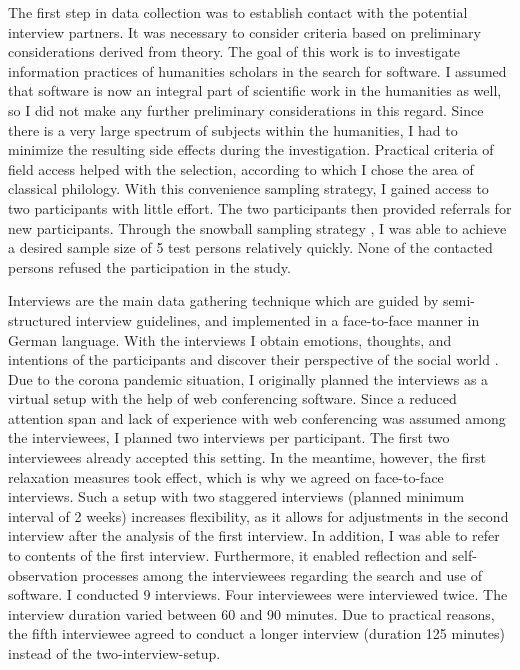 \documentclass[12pt, a4paper, titlepage, oneside, abstract=true, toc=listof, toc=bibliography]{scrreprt}
\begin{document}
The first step in data collection was to establish contact with the potential interview partners. It was necessary to consider criteria based on preliminary considerations derived from theory. The goal of this work is to investigate information practices of humanities scholars in the search for software. I assumed that software is now an integral part of scientific work in the humanities as well, so I did not make any further preliminary considerations in this regard. Since there is a very large spectrum of subjects within the humanities, I had to minimize the resulting side effects during the investigation. Practical criteria of field access helped with the selection, according to which I chose the area of classical philology. With this convenience sampling strategy, I gained access to two participants with little effort. The two participants then provided referrals for new participants. Through the snowball sampling strategy \citep{Biernacki1981}, I was able to achieve a desired sample size of 5 test persons relatively quickly. None of the contacted persons refused the participation in the study.

Interviews are the main data gathering technique which are guided by semi-structured interview guidelines, and implemented in a face-to-face manner \citep{Bryman2004} in German language. With the interviews I obtain emotions, thoughts, and intentions of the participants and discover their perspective of the social world \citep{Patton2002}. Due to the corona pandemic situation, I originally planned the interviews as a virtual setup with the help of web conferencing software. Since a reduced attention span and lack of experience with web conferencing was assumed among the interviewees, I planned two interviews per participant. The first two interviewees already accepted this setting. In the meantime, however, the first relaxation measures took effect, which is why we agreed on face-to-face interviews. Such a setup with two staggered interviews (planned minimum interval of 2 weeks) increases flexibility, as it allows for adjustments in the second interview after the analysis of the first interview. In addition, I was able to refer to contents of the first interview. Furthermore, it enabled reflection and self-observation processes among the interviewees regarding the search and use of software. I conducted 9 interviews. Four interviewees were interviewed twice. The interview duration varied between 60 and 90 minutes. Due to practical reasons, the fifth interviewee agreed to conduct a longer interview (duration 125 minutes) instead of the two-interview-setup.
\end{document}
